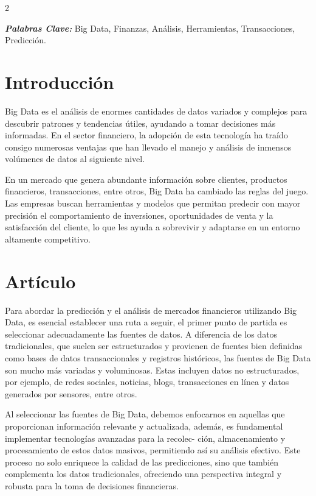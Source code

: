 \documentclass[12pt,spanish,Letterpaper,openany]{book}
\begin{document}
\begin {multicols}{2}

\textbf{\emph{Palabras Clave:}} Big Data, Finanzas, Análisis, Herramientas, Transacciones, Predicción.

\hypertarget{introducciuxf3n-12}{%
\section{Introducción}\label{introducciuxf3n-12}}

Big Data es el análisis de enormes cantidades de datos variados y complejos para descubrir patrones y tendencias útiles, ayudando a tomar decisiones más informadas. En el sector financiero, la adopción de esta tecnología ha traído consigo numerosas ventajas que han llevado el manejo y análisis de inmensos volúmenes de datos al siguiente nivel.

En un mercado que genera abundante información sobre clientes, productos financieros, transacciones, entre otros, Big Data ha cambiado las reglas del juego. Las empresas buscan herramientas y modelos que permitan predecir con mayor precisión el comportamiento de inversiones, oportunidades de venta y la satisfacción del cliente, lo que les ayuda a sobrevivir y adaptarse en un entorno altamente competitivo.

\hypertarget{artuxedculo-12}{%
\section{Artículo}\label{artuxedculo-12}}

Para abordar la predicción y el análisis de mercados financieros utilizando Big Data, es esencial establecer una ruta a seguir, el primer punto de partida es seleccionar adecuadamente las fuentes de datos. A diferencia de los datos tradicionales, que suelen ser estructurados y provienen de fuentes bien definidas como bases de datos transaccionales y registros históricos, las fuentes de Big Data son mucho más variadas y voluminosas. Estas incluyen datos no estructurados, por ejemplo, de redes sociales, noticias, blogs, transacciones en línea y datos generados por sensores, entre otros.

Al seleccionar las fuentes de Big Data, debemos enfocarnos en aquellas que proporcionan información relevante y actualizada, además, es fundamental implementar tecnologías avanzadas para la recolec-
ción, almacenamiento y procesamiento de estos datos masivos, permitiendo así su análisis efectivo. Este proceso no solo enriquece la calidad de las predicciones, sino que también complementa los datos tradicionales, ofreciendo una perspectiva integral y robusta para la toma de decisiones financieras.


\end{multicols}
\end{document}
